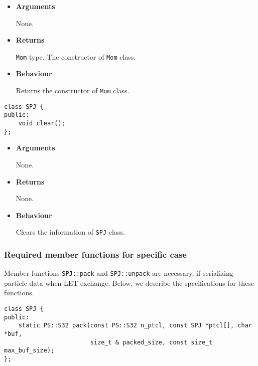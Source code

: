 \begin{itemize}
  
\item {\bf Arguments}

  None.

\item {\bf Returns}

  \texttt{Mom} type.
  The constructor of \texttt{Mom} class.

\item {\bf Behaviour}

  Returns the constructor of \texttt{Mom} class.

\end{itemize}


\begin{screen}
\begin{verbatim}
class SPJ {
public:
    void clear();
};
\end{verbatim}
\end{screen}

\begin{itemize}
  
\item {\bf Arguments}

  None.

\item {\bf Returns}

  None.
  
\item {\bf Behaviour}

  Clears the information of \texttt{SPJ} class.

\end{itemize}


\subsubsection{Required member functions for specific case}

\label{sec:SPJ:serialize}

Member functions \texttt{SPJ::pack} and \texttt{SPJ::unpack} are necessary, if serializing particle data when LET exchange. Below, we describe the specifications for these functions.



\begin{screen}
\begin{verbatim}
class SPJ {
public:
    static PS::S32 pack(const PS::S32 n_ptcl, const SPJ *ptcl[], char *buf, 
                        size_t & packed_size, const size_t max_buf_size);
};
\end{verbatim}
\end{screen}


